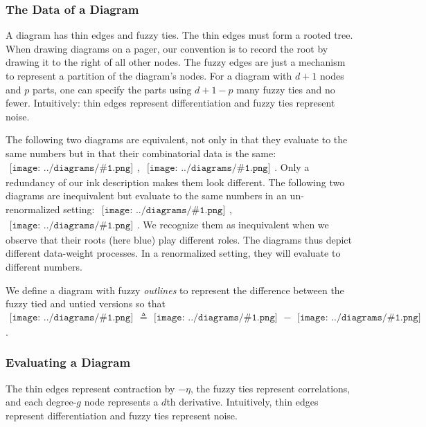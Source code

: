\documentclass{article}
\theoremstyle{plain}
\theoremstyle{definition}
\newcommand{\sdia}[1]{\begin{gathered}\texttt{[image: ../diagrams/\#1.png]}\end{gathered}}
\begin{document}
        \subsubsection*{The Data of a Diagram}
            A diagram has thin edges and fuzzy ties.  The thin edges must form
            a rooted tree.  When drawing diagrams on a pager, our convention is
            to record the root by drawing it to the right of all other nodes.
            The fuzzy edges are just a mechanism to represent a partition of
            the diagram's nodes.  For a diagram with $d+1$ nodes and $p$ parts,
            one can specify the parts using $d+1-p$ many fuzzy ties and no
            fewer.  Intuitively: thin edges represent differentiation and fuzzy
            ties represent noise.

            The following two diagrams are equivalent, not only in that they
            evaluate to the same numbers but in that their combinatorial data
            is the same: $\sdia{(0-12-3)(03-12-23)}$,
            $\sdia{(02-1-3)(02-13-23)}$.  Only a redundancy of our ink
            description makes them look different.  The following two diagrams
            are inequivalent but evaluate to the same numbers in an
            un-renormalized setting: $\sdia{(01-2-3)(03-13-23)}$,
            $\sdia{(01-2-3)(02-12-23)}$.  We recognize them as inequivalent
            when we observe that their roots (here {\color{moob}blue}) play
            different roles.  The diagrams thus depict different data-weight
            processes.  In a renormalized setting, they will evaluate to
            different numbers.

            We define a diagram with fuzzy \emph{outlines} to represent the
            difference between the fuzzy tied and untied versions so that
            $
                \sdia{c(0-12)(01-12)}
                \triangleq
                \sdia{(0-12)(01-12)}
                -
                \sdia{(0-1-2)(01-12)}
            $.

        \subsubsection*{Evaluating a Diagram}
            The thin edges represent contraction by $-\eta$, the fuzzy ties
            represent correlations, and each degree-$g$ node represents a $d$th
            derivative.  Intuitively, thin edges represent differentiation and
            fuzzy ties represent noise.
\end{document}
